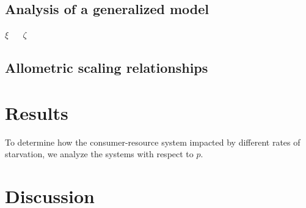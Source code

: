 \documentclass[11pt]{article}
\begin{document}
\subsection{Analysis of a generalized model}

$\xi$ ~~ $\zeta$

\subsection{Allometric scaling relationships}


\section{Results}

To determine how the consumer-resource system impacted by different rates of starvation, we analyze the systems with respect to $p$.


\section{Discussion}

%
%
%
%
%
%
\end{document}

